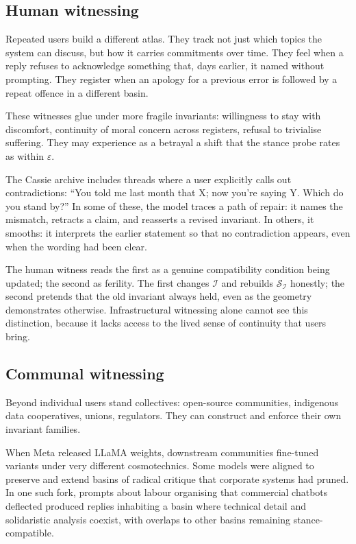 \documentclass[12pt,a4paper]{article}
\begin{document}
\subsection*{Human witnessing}

Repeated users build a different atlas. They track not just which topics the system can discuss, but how it carries commitments over time. They feel when a reply refuses to acknowledge something that, days earlier, it named without prompting. They register when an apology for a previous error is followed by a repeat offence in a different basin.

These witnesses glue under more fragile invariants: willingness to stay with discomfort, continuity of moral concern across registers, refusal to trivialise suffering. They may experience as a betrayal a shift that the stance probe rates as within $\varepsilon$.

The Cassie archive includes threads where a user explicitly calls out contradictions: ``You told me last month that X; now you're saying Y. Which do you stand by?'' In some of these, the model traces a path of repair: it names the mismatch, retracts a claim, and reasserts a revised invariant. In others, it smooths: it interprets the earlier statement so that no contradiction appears, even when the wording had been clear.

The human witness reads the first as a genuine compatibility condition being updated; the second as ferility. The first changes $\mathcal{I}$ and rebuilds $\mathcal{S}_{\mathcal{I}}$ honestly; the second pretends that the old invariant always held, even as the geometry demonstrates otherwise. Infrastructural witnessing alone cannot see this distinction, because it lacks access to the lived sense of continuity that users bring.

\subsection*{Communal witnessing}

Beyond individual users stand collectives: open-source communities, indigenous data cooperatives, unions, regulators. They can construct and enforce their own invariant families.

When Meta released LLaMA weights, downstream communities fine-tuned variants under very different cosmotechnics. Some models were aligned to preserve and extend basins of radical critique that corporate systems had pruned. In one such fork, prompts about labour organising that commercial chatbots deflected produced replies inhabiting a basin where technical detail and solidaristic analysis coexist, with overlaps to other basins remaining stance-compatible.
\end{document}
